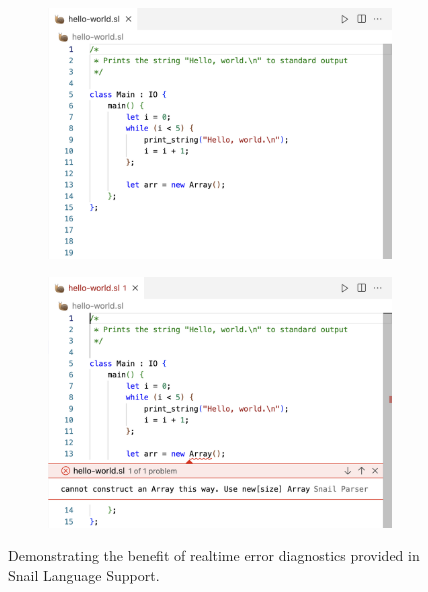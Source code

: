 \documentclass{article}
\begin{document}
\begin{figure}[t]
    \begin{subfigure}{0.45\textwidth}
        \begin{center}
            \includegraphics[width=\textwidth]{screenshots/dev-no-diagnostics-light.png}
            \label{fig:dev-no-diagnostics}
        \end{center}
    \end{subfigure}
    \hspace{0.05\textwidth}
    \begin{subfigure}{0.45\textwidth}
        \begin{center}
            \includegraphics[width=\textwidth]{screenshots/dev-with-diagnostics-light.png}
            \label{fig:dev-with-diagnostics}
        \end{center}
    \end{subfigure}
    \caption{
        \centering
            Demonstrating the benefit of realtime error diagnostics provided in Snail Language Support.
        }
    \label{fig:dev-diagnostics}
\end{figure}
\end{document}
